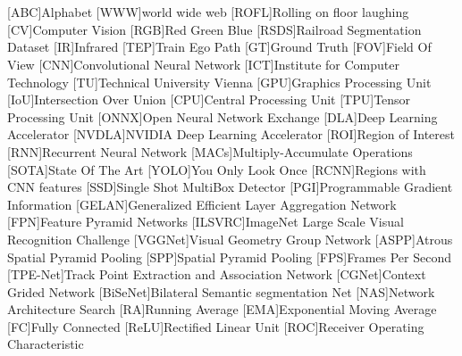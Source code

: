 {}
\chapter*{\listacroname}
\begin{acronym}[XXXXX]
    [ABC]{Alphabet}
    [WWW]{world wide web}
    [ROFL]{Rolling on floor laughing}
    [CV]{Computer Vision}
    [RGB]{Red Green Blue}
    [RSDS]{Railroad Segmentation Dataset}
    [IR]{Infrared}
    [TEP]{Train Ego Path}
    [GT]{Ground Truth}
    [FOV]{Field Of View}
    [CNN]{Convolutional Neural Network}
    [ICT]{Institute for Computer Technology}
    [TU]{Technical University Vienna}
    [GPU]{Graphics Processing Unit}
    [IoU]{Intersection Over Union}
    [CPU]{Central Processing Unit}
    [TPU]{Tensor Processing Unit}
    [ONNX]{Open Neural Network Exchange}
    [DLA]{Deep Learning Accelerator}
    [NVDLA]{NVIDIA Deep Learning Accelerator}
    [ROI]{Region of Interest}
    [RNN]{Recurrent Neural Network}
    [MACs]{Multiply-Accumulate Operations}
    [SOTA]{State Of The Art}
    [YOLO]{You Only Look Once}
    [RCNN]{Regions with CNN features}
    [SSD]{Single Shot MultiBox Detector}
    [PGI]{Programmable Gradient Information}
    [GELAN]{Generalized Efficient Layer Aggregation Network}
    [FPN]{Feature Pyramid Networks}
    [ILSVRC]{ImageNet Large Scale Visual Recognition Challenge}
    [VGGNet]{Visual Geometry Group Network}
    [ASPP]{Atrous Spatial Pyramid Pooling}
    [SPP]{Spatial Pyramid Pooling}
    [FPS]{Frames Per Second}
    [TPE-Net]{Track Point Extraction and Association Network}
    [CGNet]{Context Grided Network}
    [BiSeNet]{Bilateral Semantic segmentation Net}
    [NAS]{Network Architecture Search}
    [RA]{Running Average}
    [EMA]{Exponential Moving Average}
    [FC]{Fully Connected}
    [ReLU]{Rectified Linear Unit}
    [ROC]{Receiver Operating Characteristic}
\end{acronym}